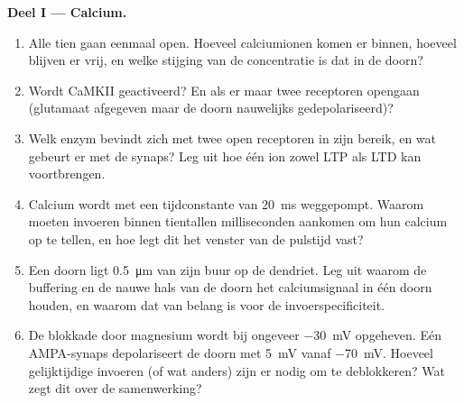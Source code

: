 \begin{problem}
\medskip
\noindent\textbf{Deel I --- Calcium.}
\begin{enumerate}
  \item Alle tien  gaan eenmaal open. Hoeveel
        calciumionen komen er binnen, hoeveel blijven er vrij, en welke
        stijging van de concentratie is dat in de doorn?
  \item Wordt CaMKII geactiveerd? En als er maar twee receptoren
        opengaan (glutamaat afgegeven maar de doorn nauwelijks
        gedepolariseerd)?
  \item Welk enzym bevindt zich met twee open receptoren in zijn
        bereik, en wat gebeurt er met de synaps? Leg uit hoe één ion
        zowel LTP als LTD kan voortbrengen.
  \item Calcium wordt met een tijdconstante van \qty{20}{ms}
        weggepompt. Waarom moeten invoeren binnen tientallen
        milliseconden aankomen om hun calcium op te tellen, en hoe legt
        dit het venster van de pulstijd vast?
  \item Een doorn ligt \qty{0.5}{\micro m} van zijn buur op de
        dendriet. Leg uit waarom de buffering en de nauwe hals van de
        doorn het calciumsignaal in één doorn houden, en waarom dat van
        belang is voor de invoerspecificiteit.
  \item De blokkade door magnesium wordt bij ongeveer \qty{-30}{mV}
        opgeheven. Eén AMPA-synaps depolariseert de doorn met
        \qty{5}{mV} vanaf \qty{-70}{mV}. Hoeveel gelijktijdige invoeren
        (of wat anders) zijn er nodig om  te
        deblokkeren? Wat zegt dit over de samenwerking?
\end{enumerate}


\end{problem}
